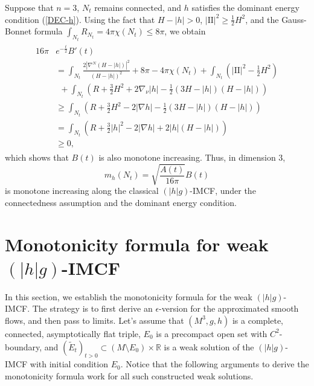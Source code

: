 \documentclass[11pt, letterpaper]{amsart}
\theoremstyle{definition}
\theoremstyle{remark}
\begin{document}
Suppose that $n=3$, $N_t$ remains connected, and $h$ satisfies the dominant energy condition (\ref{DEC-h}).
	Using the fact that $ H- |h|>0$, $|\mathrm{II}|^2 \geq \frac{1}{2} H^2$, and the Gauss-Bonnet formula $\int_{N_t} R_{N_t} = 4 \pi \chi (N_t) \leq 8 \pi $,  we obtain
	\begin{align*}
		\begin{split}
			16 \pi &e ^{- \frac{t}{2}} B'(t)\\
			       &= \int_{N_t} \frac{2 |\nabla ^{N} (H-|h| )|^2}{(H-|h| )^2} + 8 \pi - 4 \pi \chi (N_{t}) + \int_{N_t}\left( |\mathrm{II}|^2 - \frac{1}{2} H^2 \right) \\
			       &\ \ +\int_{N_t}   \left(     R + \frac{3}{2} H^2  + 2 \nabla_{\nu } |h|    -\frac{1}{2}(3H-|h| )(H-|h| ) \right) \\
			&\geq  \int_{N_t}   \left(     R + \frac{3}{2} H^2  - 2 |\nabla h |   -\frac{1}{2}(3H-|h| )(H-|h| ) \right)  \\
					      & =  \int_{N_t}   \left(   R + \frac{3}{2}  |h|^2  - 2 |\nabla h |   + 2 |h| (H-|h| ) \right)  \\
					      &\geq 0,
		\end{split}
	\end{align*}
	which shows that $B(t)$ is also monotone increasing. Thus, in dimension $3$, 
	$$m_{h}(N_t) = \sqrt{\frac{A(t)}{16 \pi }} B(t)$$ 
	is monotone increasing along the classical $(|h| g)$-IMCF, under the connectedness assumption and the dominant energy condition.
	

\section{Monotonicity formula for weak $(|h| g)$-IMCF}\label{sect-monotonicity}
In this section, we establish the monotonicity formula for the weak $(|h|g)$-IMCF. The strategy is to first derive an $\epsilon $-version for the approximated smooth flows, and then pass to limits. Let's assume that $(M^3 ,g, h)$ is a complete, connected, asymptotically flat triple, $E_0$ is a precompact open set with $C^2$-boundary, and $(\tilde{E}_t)_{t>0} \subset (M \setminus E_0) \times \mathbb{R}$ is a weak solution of the $(|h| g)$-IMCF with initial condition $E_0$. Notice that the following arguments to derive the monotonicity formula work for all such constructed weak solutions.
\end{document}
